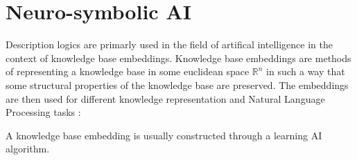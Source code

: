 

%
\chapter*{\thechapter \quad Neuro-symbolic AI}
\label{appendixB}

Description logics are primarly used in the field of artifical intelligence in the context of knowledge base embeddings.
Knowledge base embeddings are methods of representing a knowledge base in some euclidean space $\mathbb{R}^n$
in such a way that some structural properties of the knowledge base are preserved. The embeddings are then used
for different knowledge representation and Natural Language Processing tasks \cite{SurveryKG}:


A knowledge base embedding is usually constructed through a learning AI algorithm.